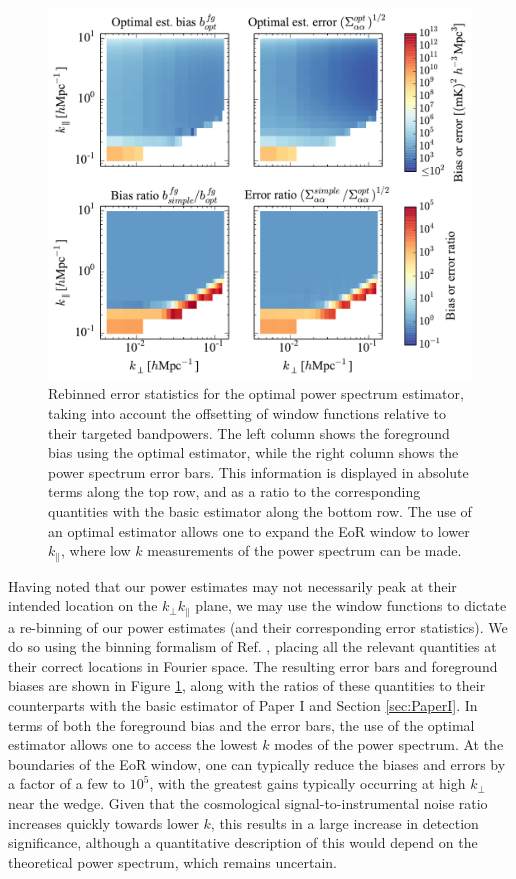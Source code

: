 \documentclass[twocolumn,aps,prd,nofootinbib,showpacs]{revtex4-1}
\begin{document}
\begin{figure}[!ht] 
	\centering 
	\includegraphics[width=1.\textwidth]{figures/optBiasAndErrorComparisons.pdf}
	\caption{Rebinned error statistics for the optimal power spectrum estimator, taking into account the offsetting of window functions relative to their targeted bandpowers.  The left column shows the foreground bias using the optimal estimator, while the right column shows the power spectrum error bars.  This information is displayed in absolute terms along the top row, and as a ratio to the corresponding quantities with the basic estimator along the bottom row.  The use of an optimal estimator allows one to expand the EoR window to lower $k_\parallel$, where low $k$ measurements of the power spectrum can be made.}
	\label{fig:optBiasAndErrorComparisons}
\end{figure} 

Having noted that our power estimates may not necessarily peak at their intended location on the $k_\perp k_\parallel$ plane, we may use the window functions to dictate a re-binning of our power estimates (and their corresponding error statistics).  We do so using the binning formalism of Ref. \cite{Dillon2014}, placing all the relevant quantities at their correct locations in Fourier space.  The resulting error bars and foreground biases are shown in Figure \ref{fig:optBiasAndErrorComparisons}, along with the ratios of these quantities to their counterparts with the basic estimator of Paper I and Section \ref{sec:PaperI}.  In terms of both the foreground bias and the error bars, the use of the optimal estimator allows one to access the lowest $k$ modes of the power spectrum.  At the boundaries of the EoR window, one can typically reduce the biases and errors by a factor of a few to $10^5$, with the greatest gains typically occurring at high $k_\perp$ near the wedge.  Given that the cosmological signal-to-instrumental noise ratio increases quickly towards lower $k$, this results in a large increase in detection significance, although a quantitative description of this would depend on the theoretical power spectrum, which remains uncertain.
\end{document}
